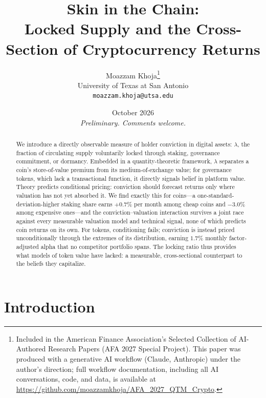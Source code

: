 \documentclass[12pt]{article}
\title{\textbf{Skin in the Chain:\\
Locked Supply and the Cross-Section of Cryptocurrency Returns}}
\author{Moazzam Khoja\thanks{Included in the American Finance Association's Selected Collection of AI-Authored Research Papers (AFA 2027 Special Project). This paper was produced with a generative AI workflow (Claude, Anthropic) under the author's direction; full workflow documentation, including all AI conversations, code, and data, is available at \url{https://github.com/moazzamkhoja/AFA_2027_QTM_Crypto}.}\\
\small University of Texas at San Antonio\\
\small \texttt{moazzam.khoja@utsa.edu}}
\date{October 2026\\[0.5em]
\small \textit{Preliminary. Comments welcome.}}
\begin{document}
\maketitle

\begin{abstract}
\begin{singlespace}
\noindent
We introduce a directly observable measure of holder conviction in digital assets:
$\lambda$, the fraction of circulating supply voluntarily locked through staking,
governance commitment, or dormancy. Embedded in a quantity-theoretic framework,
$\lambda$ separates a coin's store-of-value premium from its medium-of-exchange value;
for governance tokens, which lack a transactional function, it directly signals belief
in platform value. Theory predicts conditional pricing: conviction should forecast
returns only where valuation has not yet absorbed it. We find exactly this for
coins---a one-standard-deviation-higher staking share earns $+0.7\%$ per month among
cheap coins and $-3.0\%$ among expensive ones---and the conviction--valuation
interaction survives a joint race against every measurable valuation model and
technical signal, none of which predicts coin returns on its own. For tokens,
conditioning fails; conviction is instead priced unconditionally through the extremes
of its distribution, earning $1.7\%$ monthly factor-adjusted alpha that no competitor
portfolio spans. The locking ratio thus provides what models of token value have
lacked: a measurable, cross-sectional counterpart to the beliefs they capitalize.
\end{singlespace}
\end{abstract}

\newpage

\section{Introduction}
\label{sec:intro}
\end{document}
